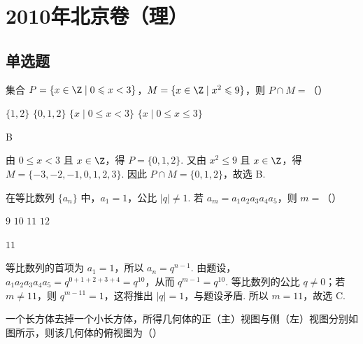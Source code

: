 
\chapter{2010年北京卷（理）}

\section{单选题}

\begin{problem}
集合 \(P = \{x \in \Z \mid 0 \leqslant x < 3\}\)，\(M = \{x \in \Z \mid x^2 \leqslant 9\}\)，则 \(P \cap M =\)（\quad）

\choices
    {\( \{1, 2\} \)}
    {\(\{0, 1, 2\}\)}
    {\(\{x\mid 0\leqslant x < 3\}\)}
    {\(\{x\mid 0\leqslant x\leqslant 3\}\)}
\end{problem}

\begin{answer}
B
\end{answer}

\begin{solution}
由 \(0\leqslant x<3\) 且 \(x\in\Z\)，得 \(P=\{0,1,2\}\). 又由 \(x^{2}\leqslant9\) 且 \(x\in\Z\)，得 \(M=\{-3,-2,-1,0,1,2,3\}\). 因此 \(P\cap M=\{0,1,2\}\)，故选 B.
\end{solution}

\begin{problem}
在等比数列 \(\{a_{n}\}\) 中，\(a_{1} = 1\)，公比 \(|q| \neq 1\). 若 \(a_{m} = a_{1}a_{2}a_{3}a_{4}a_{5}\)，则 \(m =\)（\quad）

\choices
    {\(9\)}
    {\(10\)}
    {\(11\)}
    {\(12\)}
\end{problem}

\begin{answer}
\(11\)
\end{answer}

\begin{solution}
等比数列的首项为 \(a_{1}=1\)，所以 \(a_{n}=q^{n-1}\). 由题设，\(a_{1}a_{2}a_{3}a_{4}a_{5}=q^{0+1+2+3+4}=q^{10}\)，从而 \(q^{m-1}=q^{10}\). 等比数列的公比 \(q\ne0\)；若 \(m\ne11\)，则 \(q^{m-11}=1\)，这将推出 \(\lvert q\rvert=1\)，与题设矛盾. 所以 \(m=11\)，故选 C.
\end{solution}

\begin{problem}
一个长方体去掉一个小长方体，所得几何体的正（主）视图与侧（左）视图分别如图所示，则该几何体的俯视图为（\quad）


    {}
    {}
    {}
\end{problem}

